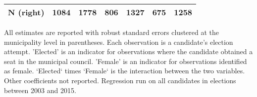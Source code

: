 \begin{table}[!h]
\begin{threeparttable}
\begin{tabular}[t]{lcccccc}
N (right) & \multicolumn{1}{c}{1084} & \multicolumn{1}{c}{1778} & \multicolumn{1}{c}{806} & \multicolumn{1}{c}{1327} & \multicolumn{1}{c}{675} & \multicolumn{1}{c}{1258}\\
\bottomrule
\end{tabular}
\begin{tablenotes}[para]
\item All estimates are reported with robust standard errors clustered at the municipality level in parentheses. Each observation is a candidate's election attempt. 'Elected' is an indicator for observations where the candidate obtained a seat in the municipal council. 'Female' is an indicator for observations identified as female. `Elected` times `Female` is the interaction between the two variables. Other coefficients not reported. Regression run on all candidates in elections between 2003 and 2015.
\end{tablenotes}
\end{threeparttable}
\end{table}